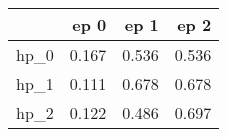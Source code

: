 \begin{tabular}{lrrr}
\toprule
{} &   ep 0 &   ep 1 &   ep 2 \\
\midrule
hp\_0 &  0.167 &  0.536 &  0.536 \\
hp\_1 &  0.111 &  0.678 &  0.678 \\
hp\_2 &  0.122 &  0.486 &  0.697 \\
\bottomrule
\end{tabular}
